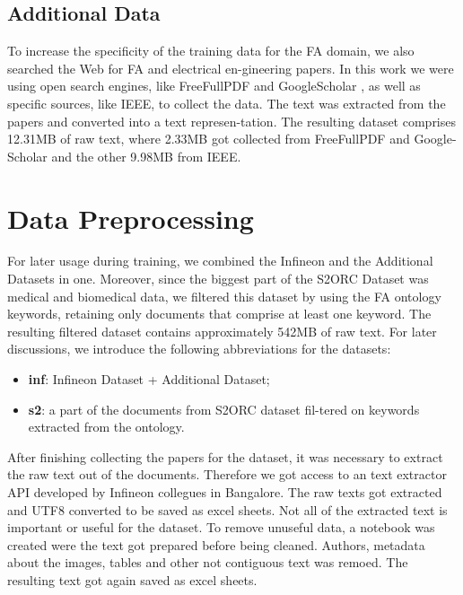 \subsection{Additional Data}
To increase the specificity of the training data for the FA domain, we also searched the Web for FA and electrical en-gineering papers. In this work we were using open search engines, like FreeFullPDF  and GoogleScholar , as well as specific sources, like IEEE, to collect the data. The text was extracted from the papers and converted into a text represen-tation. The resulting dataset comprises 12.31MB of raw text, where 2.33MB got collected from FreeFullPDF and Google-Scholar and the other 9.98MB from IEEE.

\section{Data Preprocessing}
For later usage during training, we combined the Infineon and the Additional Datasets in one. Moreover, since the biggest part of the S2ORC Dataset was medical and biomedical data, we filtered this dataset by using the FA ontology keywords, retaining only documents that comprise at least one keyword. The resulting filtered dataset contains approximately 542MB of raw text. For later discussions, we introduce the following abbreviations for the datasets:

\begin{itemize}
	\item \textbf{inf}: Infineon Dataset + Additional Dataset;
	\item \textbf{s2}: a part of the documents from S2ORC dataset fil-tered on keywords extracted from the ontology.
\end{itemize}

After finishing collecting the papers for the dataset, it was necessary to extract the raw text out of the documents. Therefore we got access to an text extractor API developed by Infineon collegues in Bangalore. The raw texts got extracted and UTF8 converted to be saved as excel sheets. \newline
Not all of the extracted text is important or useful for the dataset. To remove unuseful data, a notebook was created were the text got prepared before being cleaned. Authors, metadata about the images, tables and other not contiguous text was remoed. The resulting text got again saved as excel sheets.

